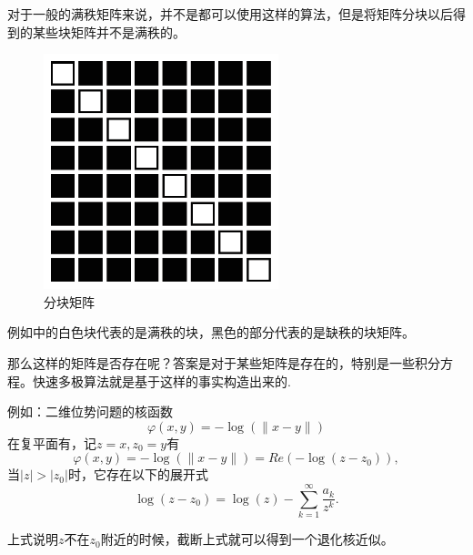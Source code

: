 对于一般的满秩矩阵来说，并不是都可以使用这样的算法，但是将矩阵分块以后得到的某些块矩阵并不是满秩的。

\begin{figure}[htbp]
	\begin{center}
		\includegraphics{pics/block_matrix.eps}
	\end{center}
	\caption{分块矩阵}
	\label{fig:blockmatrix}
\end{figure}
例如中的白色块代表的是满秩的块，黑色的部分代表的是缺秩的块矩阵。

那么这样的矩阵是否存在呢？答案是对于某些矩阵是存在的，特别是一些积分方程。快速多极算法就是基于这样的事实构造出来的.

例如：二维位势问题的核函数
\begin{equation}
	\varphi(x,y) = - \log (\|x-y\|)
\end{equation}
在复平面有，记$z = x, z_0 = y$有
\begin{equation}
	\varphi(x,y) = - \log (\|x-y\|) = Re (-\log(z-z_0)),
\end{equation}
当$|z| > |z_0|$时，它存在以下的展开式
\begin{equation}
	\log(z-z_0) = \log(z) - \sum_{k=1}^{\infty} \frac{a_k}{z^k}.
	\label{eq_expan}
\end{equation}
\begin{remark}
	上式说明$z$不在$z_0$附近的时候，截断上式就可以得到一个退化核近似。
\end{remark}

